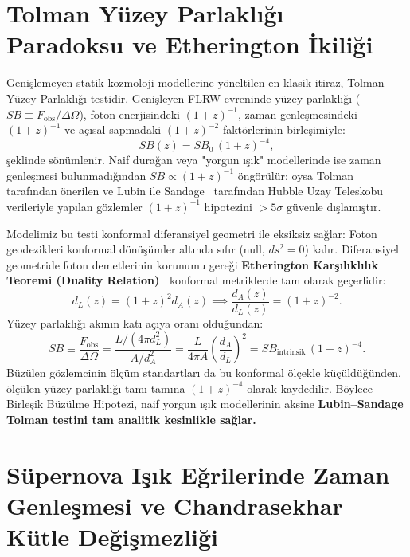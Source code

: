 \documentclass[11pt,a4paper]{article}
\begin{document}
\section{Tolman Yüzey Parlaklığı Paradoksu ve Etherington İkiliği}
\label{sec:tolman_ve_etherington_makale_a}

Genişlemeyen statik kozmoloji modellerine yöneltilen en klasik itiraz, Tolman Yüzey Parlaklığı testidir. Genişleyen FLRW evreninde yüzey parlaklığı ($SB \equiv F_{\mathrm{obs}} / \Delta \Omega$), foton enerjisindeki $(1+z)^{-1}$, zaman genleşmesindeki $(1+z)^{-1}$ ve açısal sapmadaki $(1+z)^{-2}$ faktörlerinin birleşimiyle:
\begin{equation}
    SB(z) = SB_0 \, (1+z)^{-4},
    \label{eq:tolman_standart}
\end{equation}
şeklinde sönümlenir. Naif durağan veya "yorgun ışık" modellerinde ise zaman genleşmesi bulunmadığından $SB \propto (1+z)^{-1}$ öngörülür; oysa Tolman~\cite{tolman1930} tarafından önerilen ve Lubin ile Sandage~\cite{lubin2001} tarafından Hubble Uzay Teleskobu verileriyle yapılan gözlemler $(1+z)^{-1}$ hipotezini $>5\sigma$ güvenle dışlamıştır.

Modelimiz bu testi konformal diferansiyel geometri ile eksiksiz sağlar:
Foton geodezikleri konformal dönüşümler altında sıfır (null, $ds^2 = 0$) kalır. Diferansiyel geometride foton demetlerinin korunumu gereği \textbf{Etherington Karşılıklılık Teoremi (Duality Relation)~\cite{etherington1933}} konformal metriklerde tam olarak geçerlidir:
\begin{equation}
    d_L(z) = (1+z)^2 d_A(z) \implies \frac{d_A(z)}{d_L(z)} = (1+z)^{-2}.
    \label{eq:etherington_korunumu_a}
\end{equation}
Yüzey parlaklığı akının katı açıya oranı olduğundan:
\begin{equation}
    SB \equiv \frac{F_{\mathrm{obs}}}{\Delta \Omega} = \frac{L / (4\pi d_L^2)}{A / d_A^2} = \frac{L}{4\pi A} \left( \frac{d_A}{d_L} \right)^2 = SB_{\mathrm{intrinsik}} \, (1+z)^{-4}.
    \label{eq:tolman_ispat_a}
\end{equation}
Büzülen gözlemcinin ölçüm standartları da bu konformal ölçekle küçüldüğünden, ölçülen yüzey parlaklığı tamı tamına $(1+z)^{-4}$ olarak kaydedilir. Böylece Birleşik Büzülme Hipotezi, naif yorgun ışık modellerinin aksine \textbf{Lubin--Sandage Tolman testini tam analitik kesinlikle sağlar.}

\section{Süpernova Işık Eğrilerinde Zaman Genleşmesi ve Chandrasekhar Kütle Değişmezliği}
\label{sec:zaman_genlesmesi_ve_chandrasekhar}
\end{document}
